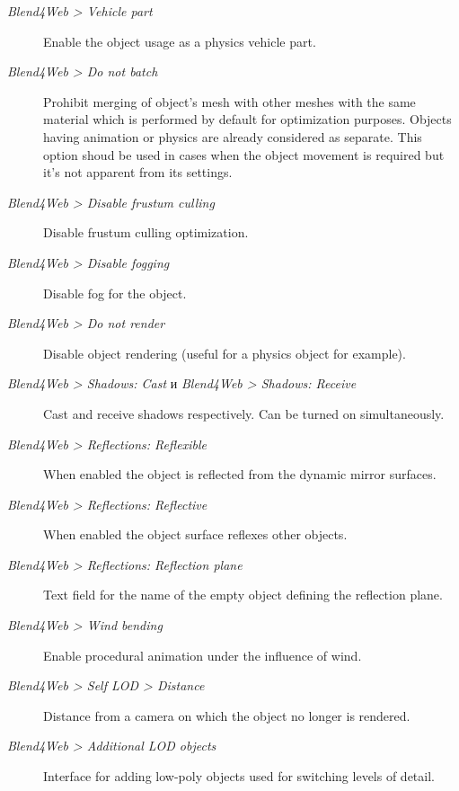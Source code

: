 \documentclass[a4paper,12pt,oneside]{sphinxmanual}
\begin{document}
\begin{description}
\item[{\emph{Blend4Web \textgreater{} Vehicle part}}] \leavevmode
Enable the object usage as a physics vehicle part.

\item[{\emph{Blend4Web \textgreater{} Do not batch}}] \leavevmode
Prohibit merging of object's mesh with other meshes with the same material which is performed by default for optimization purposes. Objects having animation or physics are already considered as separate. This option shoud be used in cases when the object movement is required but it's not apparent from its settings.

\item[{\emph{Blend4Web \textgreater{} Disable frustum culling}}] \leavevmode
Disable frustum culling optimization.

\item[{\emph{Blend4Web \textgreater{} Disable fogging}}] \leavevmode
Disable fog for the object.

\item[{\emph{Blend4Web \textgreater{} Do not render}}] \leavevmode
Disable object rendering (useful for a physics object for example).

\item[{\emph{Blend4Web \textgreater{} Shadows: Cast} и \emph{Blend4Web \textgreater{} Shadows: Receive}}] \leavevmode
Cast and receive shadows respectively. Can be turned on simultaneously.

\item[{\emph{Blend4Web \textgreater{} Reflections: Reflexible}}] \leavevmode
When enabled the object is reflected from the dynamic mirror surfaces.

\item[{\emph{Blend4Web \textgreater{} Reflections: Reflective}}] \leavevmode
When enabled the object surface reflexes other objects.

\item[{\emph{Blend4Web \textgreater{} Reflections: Reflection plane}}] \leavevmode
Text field for the name of the empty object defining the reflection plane.

\item[{\emph{Blend4Web \textgreater{} Wind bending}}] \leavevmode
Enable procedural animation under the influence of wind.

\item[{\emph{Blend4Web \textgreater{} Self LOD \textgreater{} Distance}}] \leavevmode
Distance from a camera on which the object no longer is rendered.

\item[{\emph{Blend4Web \textgreater{} Additional LOD objects}}] \leavevmode
Interface for adding low-poly objects used for switching levels of detail.

\end{description}
\end{document}
